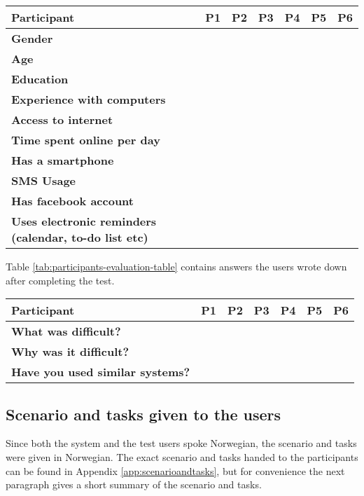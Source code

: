 \begin{sidewaystable}
	\label{tab:participants-table}
	\begin{tabular}{ | p{3.5cm} | p{3.0cm} | p{3.0cm} | p{3.0cm} | p{3.0cm} | p{3.0cm} | p{3.0cm} |}
	\hline
	\textbf{Participant} & P1 & P2 & P3 & P4 & P5 & P6 \\ \hline
	\textbf{Gender} & & & & & & \\ \hline
	\textbf{Age} & & & & & & \\ \hline
	\textbf{Education} & & & & & & \\ \hline
	\textbf{Experience with computers} & & & & & & \\ \hline
	\textbf{Access to internet} & & & & & & \\ \hline
	\textbf{Time spent online per day} & & & & & & \\ \hline
	\textbf{Has a smartphone} & & & & & & \\ \hline
	\textbf{SMS Usage} & & & & & & \\ \hline
	\textbf{Has facebook account} & & & & & & \\ \hline
	\textbf{Uses electronic reminders (calendar, to-do list etc)} & & & & & & \\ \hline
	\end{tabular}
	\caption{Participants' experience with IT solutions}
\end{sidewaystable}


Table \ref{tab:participants-evaluation-table} contains answers the users wrote down after completing the test.

\begin{sidewaystable}
	\label{tab:participants-evaluation-table}
	\begin{tabular}{ | p{3.5cm} | p{3.0cm} | p{3.0cm} | p{3.0cm} | p{3.0cm} | p{3.0cm} | p{3.0cm} | }
	\hline
	\textbf{Participant} & P1 & P2 & P3 & P4 & P5 & P6 \\ \hline
	\textbf{What was difficult?} & & & & & & \\ \hline
	\textbf{Why was it difficult?} & & & & & & \\ \hline
	\textbf{Have you used similar systems?} & & & & & & \\ \hline
	\end{tabular}
	\caption{Participants's opinions upon finishing the test}
\end{sidewaystable}



\subsection{Scenario and tasks given to the users}
Since both the system and the test users spoke Norwegian, the scenario and tasks were given in Norwegian. The exact scenario and tasks handed to the participants can be found in Appendix \ref{app:scenarioandtasks}, but for convenience the next paragraph gives a short summary of the scenario and tasks.

